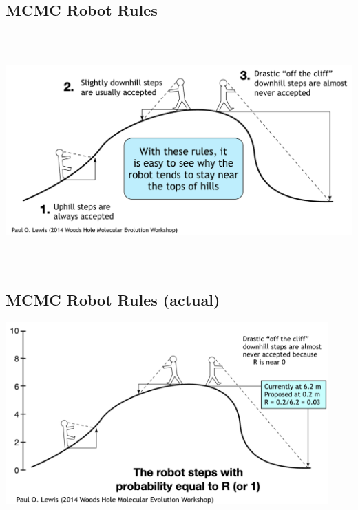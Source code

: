 \documentclass[
  letterpaper,
  DIV=11,
  numbers=noendperiod]{scrartcl}
\begin{document}
\hypertarget{mcmc-robot-rules}{%
\subsection{MCMC Robot Rules}\label{mcmc-robot-rules}}

\begin{center}
  \includegraphics[height=9cm]{../graphics/mcmc-robot.png}
\end{center}

\hypertarget{mcmc-robot-rules-actual}{%
\subsection{MCMC Robot Rules (actual)}\label{mcmc-robot-rules-actual}}

\begin{center}
  \includegraphics[height=7cm]{../graphics/mcmc-robot2.png}
\end{center}

\framebreak
\end{document}
